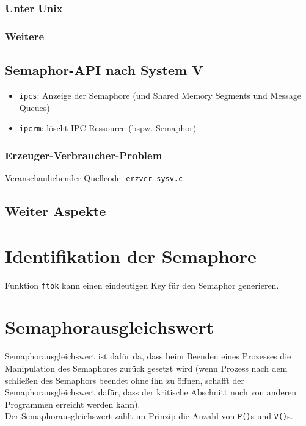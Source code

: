 \subsubsection*{Unter Unix}
\subsubsection*{Weitere}
\subsection{Semaphor-API nach System V}
\begin{itemize}
\item \lstinline$ipcs$: Anzeige der Semaphore (und Shared Memory Segments und Message Queues)
\item \lstinline$ipcrm$: löscht IPC-Ressource (bspw. Semaphor)
\end{itemize}

\subsubsection*{Erzeuger-Verbraucher-Problem}
Veranschaulichender Quellcode: \lstinline$erzver-sysv.c$

\subsection*{Weiter Aspekte}

\section{Identifikation der Semaphore}
Funktion \lstinline$ftok$ kann einen eindeutigen Key für den Semaphor generieren.

\section{Semaphorausgleichswert}
Semaphorausgleichswert ist dafür da, dass beim Beenden eines Prozesses die Manipulation des Semaphores zurück gesetzt wird (wenn Prozess nach dem schließen des Semaphors beendet ohne ihn zu öffnen, schafft der Semaphorausgleichswert dafür, dass der kritische Abschnitt noch von anderen Programmen erreicht werden kann).\\
Der Semaphorausgleichswert zählt im Prinzip die Anzahl von \lstinline$P()$s und \lstinline$V()$s.


